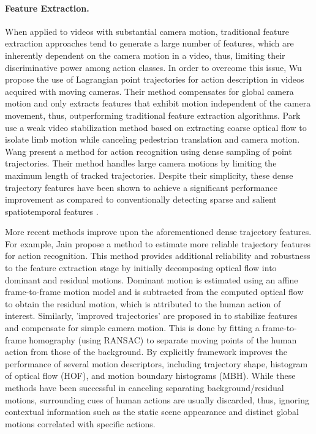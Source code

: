 \paragraph{\textbf{Feature Extraction.}} When applied to videos with substantial camera motion, traditional feature extraction approaches tend to generate a large number of features, which are inherently dependent on the camera motion in a video, thus, limiting their discriminative power among action classes. In order to overcome this issue, Wu \etal \cite{wu2011} propose the use of Lagrangian point trajectories for action description in videos acquired with moving cameras. Their method compensates for global camera motion and only extracts features that exhibit motion independent of the camera movement, thus, outperforming traditional feature extraction algorithms. Park \etal \cite{park2013} use a weak video stabilization method based on extracting coarse optical flow to isolate limb motion while canceling pedestrian translation and camera motion. Wang \etal \cite{wang2011} present a method for action recognition using dense sampling of point trajectories. Their method handles large camera motions by limiting the maximum length of tracked trajectories. Despite their simplicity, these dense trajectory features have been shown to achieve a significant performance improvement as compared to conventionally detecting sparse and salient spatiotemporal features \cite{laptev2005}.

More recent methods improve upon the aforementioned dense trajectory features. For example, Jain \etal \cite{jain2013} propose a method to estimate more reliable trajectory features for action recognition. This method provides additional reliability and robustness to the feature extraction stage by initially decomposing optical flow into dominant and residual motions. Dominant motion is estimated using an affine frame-to-frame motion model and is subtracted from the computed optical flow to obtain the residual motion, which is attributed to the human action of interest. Similarly, 'improved trajectories' are proposed in \cite{wang2013} to stabilize features and compensate for simple camera motion. This is done by fitting a frame-to-frame homography (using RANSAC) to separate moving points of the human action from those of the background. By explicitly   framework improves the performance of several motion descriptors, including trajectory shape, histogram of optical flow (HOF), and motion boundary histograms (MBH). While these methods have been successful in canceling separating background/residual motions, surrounding cues of human actions are usually discarded, thus, ignoring contextual information such as the static scene appearance and distinct global motions correlated with specific actions.

